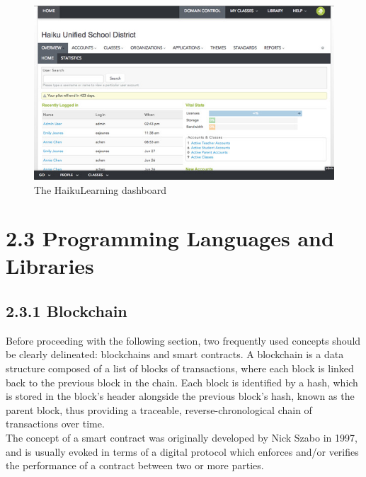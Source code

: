 \documentclass[12pt]{report}
\begin{document}
\begin{figure}[htbp]
\centering
\includegraphics{../screenshots/haikulearning.jpg}
\caption{The HaikuLearning dashboard}
\end{figure}

\section{2.3 Programming Languages and
Libraries}\label{programming-languages-and-libraries}

\subsection{2.3.1 Blockchain}\label{blockchain}

Before proceeding with the following section, two frequently used
concepts should be clearly delineated: blockchains and smart contracts.
A blockchain is a data structure composed of a list of blocks of
transactions, where each block is linked back to the previous block in
the chain\cite{antonopoulos2014mastering}. Each block is identified by a
hash, which is stored in the block's header alongside the previous
block's hash, known as the parent block\cite{antonopoulos2014mastering}, thus providing a
traceable, reverse-chronological chain of transactions over time.\\
The concept of a smart contract was originally developed by Nick Szabo
in 1997, and is usually evoked in terms of a digital protocol which
enforces and/or verifies the performance of a contract between two or
more
parties\cite{1szabo}.
\end{document}
